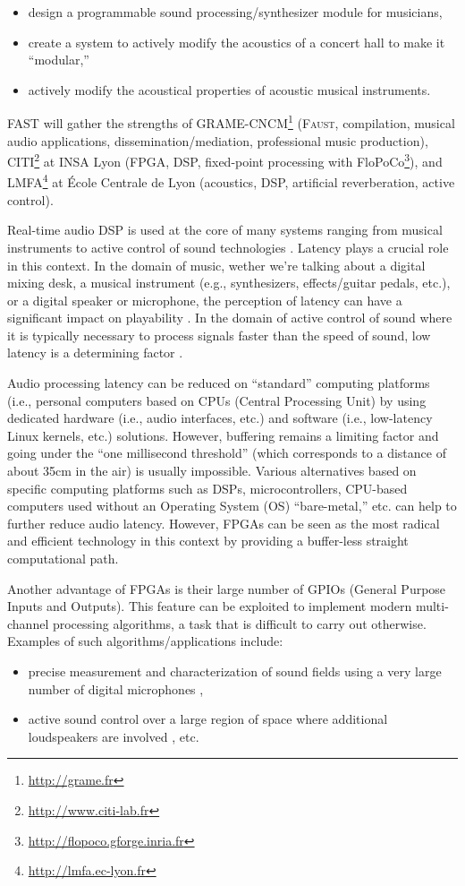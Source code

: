 \documentclass[a4paper,10pt]{article}
\newcommand{\F}{\textsc{Faust}}
\newcommand{\PP}{FAST}
\begin{document}
\begin{itemize}
  \itemsep0em
  \item design a programmable sound processing/synthesizer module for musicians, 
  \item create a system to actively modify the acoustics of a concert hall to make it ``modular,''
  \item actively modify the acoustical properties of acoustic musical instruments. 
\end{itemize}
\PP{} will gather the strengths of GRAME-CNCM\footnote{\url{http://grame.fr}} (\F{}, compilation, musical audio applications, dissemination/mediation, professional music production), CITI\footnote{\url{http://www.citi-lab.fr}} at INSA Lyon (FPGA, DSP, fixed-point processing with FloPoCo\footnote{\url{http://flopoco.gforge.inria.fr}}), and LMFA\footnote{\url{http://lmfa.ec-lyon.fr}} at École Centrale de Lyon (acoustics, DSP, artificial reverberation, active control).

Real-time audio DSP is used at the core of many systems ranging from musical instruments to active control of sound technologies \cite{nelson1991activea}. Latency plays a crucial role in this context.  In the domain of music, wether we're talking about a digital mixing desk, a musical instrument (e.g., synthesizers, effects/guitar pedals, etc.), or a digital speaker or microphone, the perception of latency can have a significant impact on playability \cite{Lago2004}. In the domain of active control of sound where it is typically necessary to process signals faster than the speed of sound, low latency is a determining factor \cite{elliott2000signal}.

Audio processing latency can be reduced on ``standard'' computing platforms (i.e., personal computers based on CPUs (Central Processing Unit) by using dedicated hardware (i.e., audio interfaces, etc.) and software (i.e., low-latency Linux kernels, etc.) solutions. However, buffering remains a limiting factor and going under the ``one millisecond threshold'' (which corresponds to a distance of about 35cm in the air) is usually impossible. Various alternatives based on specific computing platforms such as DSPs, microcontrollers, CPU-based computers used without an Operating System (OS) ``bare-metal,'' etc. can help to further reduce audio latency. However, FPGAs can be seen as the most radical and efficient technology in this context by providing a buffer-less straight computational path.

Another advantage of FPGAs is their large number of GPIOs (General Purpose Inputs and Outputs). This feature can be exploited to implement modern multi-channel processing algorithms, a task that is difficult to carry out otherwise. Examples of such algorithms/applications include: 
\begin{itemize}
	\itemsep0em
	\item precise measurement and characterization of sound fields using a very large number of digital microphones \cite{salze2019new}, 
	\item active sound control over a large region of space where additional loudspeakers are involved \cite{Zhang2018}, etc.
\end{itemize}
\end{document}
